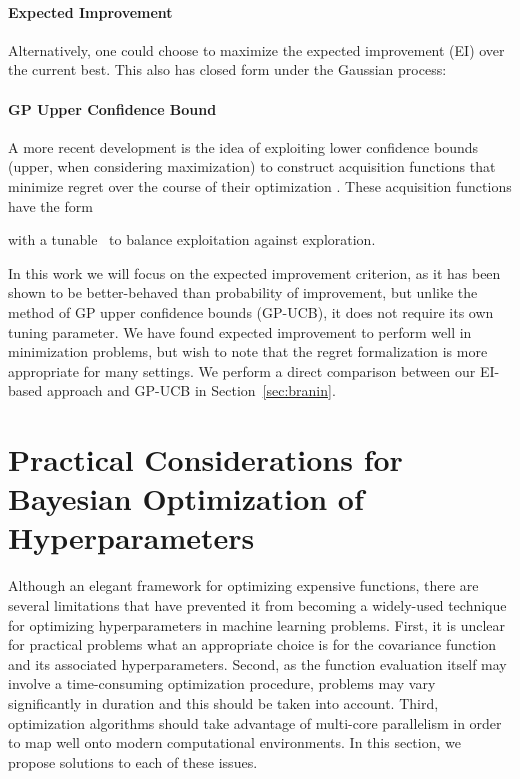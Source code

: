 \documentclass[aos,preprint]{imsart}
\begin{document}
\paragraph{Expected Improvement}
Alternatively, one could choose to maximize the expected improvement (EI)
over the current best.  This also has closed form under the Gaussian
process:


\paragraph{GP Upper Confidence Bound}
A more recent development is the idea of exploiting lower confidence
bounds (upper, when considering maximization) to construct acquisition
functions that minimize regret over the course of their optimization
\citep{Srinivas2010}.  These acquisition functions have the form

with a tunable~ to balance exploitation against exploration.

In this work we will focus on the expected improvement criterion, as
it has been shown to be better-behaved than probability of
improvement, but unlike the method of GP upper confidence bounds
(GP-UCB), it does not require its own tuning parameter.  We have found
expected improvement to perform well in minimization problems, but
wish to note that the regret formalization is more appropriate for
many settings.  We perform a direct comparison between our EI-based
approach and GP-UCB in Section~\ref{sec:branin}.

\section{Practical Considerations for Bayesian Optimization of Hyperparameters}

\label{sec:practical}
Although an elegant framework for optimizing expensive functions,
there are several limitations that have prevented it from becoming a
widely-used technique for optimizing hyperparameters in machine
learning problems.  First, it is unclear for practical problems what
an appropriate choice is for the covariance function and its
associated hyperparameters.  Second, as the function evaluation itself
may involve a time-consuming optimization procedure, problems may vary
significantly in duration and this should be taken into account.
Third, optimization algorithms should take advantage of multi-core
parallelism in order to map well onto modern computational
environments.  In this section, we propose solutions to each of these
issues.
\end{document}
